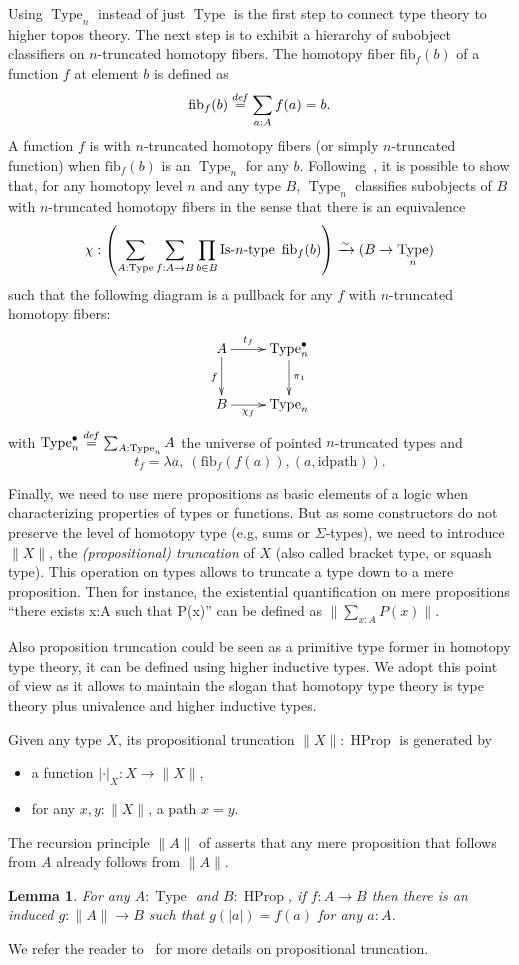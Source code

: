 \documentclass[conference]{IEEEtran}
\newtheorem{lem}[thm]{Lemma}
\newcommand \defeq {\overset{de\hspace{-0.2ex}f}{=}}
\newcommand{\eg}{e.g,\xspace}
\DeclareMathOperator{\Type}{Type}
\DeclareMathOperator{\HProp}{HProp}
\def\mymathhyphen{{\hbox{-}}}
\newcommand{\IsType}[1]
{\mathop{\mathrm{Is\mymathhyphen}#1\mathrm{\mymathhyphen type}} }
\newcommand \squash[1] {\| #1 \| }
\newcommand \fib[2] {\mathrm{fib}_{#1}(#2)}
\begin{document}
Using $\Type_n$ instead of just $\Type$ is the first step to connect
type theory to higher topos theory. The next step is to exhibit a
hierarchy of subobject classifiers on $n$-truncated homotopy fibers.
%
The homotopy fiber $\fib{f}{b}$ of a function $f$ at element $b$ is
defined as 
$$
\fib{f}{b} \defeq \sum_{a:A} f(a) = b.
$$ 
%
A function $f$ is with $n$-truncated homotopy fibers (or simply
$n$-truncated function) when $\fib{f}{b}$
is an $\Type_n$ for any $b$.  
%
Following~\cite{sets_in_hott}, it is possible to show that, for any
homotopy level $n$ and any type $B$, $\Type_n$ classifies subobjects
of $B$ with $n$-truncated homotopy fibers in the sense that there is
an equivalence
%
$$\chi : \left(\sum_{A:\Type} \sum_{f:A \to B} \prod_{b\in B}
\IsType n\
\fib{f}{b}\right) \xrightarrow{\sim} 
 (B \to \Type_n)$$
%
 such that the following diagram is a pullback for any $f$ with
 $n$-truncated homotopy fibers:
$$
\xymatrix{
  A \ar[r]^{\hspace{-1em} t_f} \ar[d]_f & \Type_n^\bullet \ar[d]^{\pi_1}\\
  B \ar[r]_{\hspace{-1em} \chi_f} & \Type_n
}
$$
with $\Type_n^\bullet \defeq \sum_{A:\Type_n} A$ the universe of pointed
$n$-truncated types and 
$$t_f = \lambda a,~(\fib{f}{f(a)},(a,\mathrm{idpath})).$$

Finally, we need to use mere propositions as basic elements of a logic
when characterizing properties of types or functions. 
%
But as some constructors do not preserve the level of homotopy type
(\eg sums or $\Sigma$-types), we need to introduce $\squash{X}$, the
{\em (propositional) truncation} of $X$ (also called bracket type, or
squash type). This operation on types allows to truncate a type down
to a mere proposition. Then for instance, the existential
quantification on mere propositions ``there exists x:A such that
P(x)'' can be defined as $ \squash{\sum_{x:A} P(x)}.  $

Also proposition truncation could be seen as a primitive type former
in homotopy type theory, it can be defined using higher inductive
types. We adopt this point of view as it allows to maintain the slogan
that homotopy type theory is type theory plus univalence and higher
inductive types.
%

Given any type $X$, its propositional truncation 
$\squash{X} : \HProp$ is generated by 
\begin{itemize}
\item a function $|\cdot|_X : X \to \squash{X}$,
\item for any $x,y:\squash{X}$, a path $x=y$.
\end{itemize}
% 
The recursion principle $\squash{A}$ of asserts that any mere
proposition that follows from $A$ already follows from $\squash{A}$.
\begin{lem}
  For any $A:\Type$ and $B:\HProp$, if $f:A \to B$ then there is an
  induced $g:\squash{A}\to B$ such that $g(|a|)= f(a)$ for any $a:A$.
\end{lem}
%
We refer the reader to~\cite{hottbook} for more details on propositional truncation.
\end{document}
